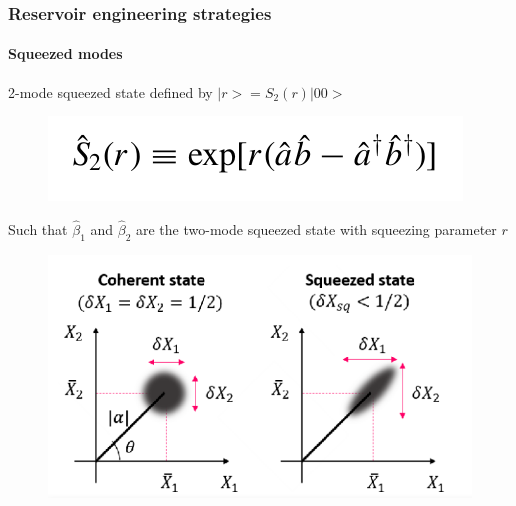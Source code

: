 \documentclass[aspectratio=43]{beamer}
\begin{document}
\begin{frame}
	
	\frametitle{Reservoir engineering strategies}
	\framesubtitle{Squeezed modes}
	
	2-mode squeezed state defined by $|r> = S_{2}(r) |00>$
	\begin{figure}
		\includegraphics[width = 5 cm]{plots/2_squeezed_mode.png}
	\end{figure}	

	Such that $\hat{\beta}_{1}$ and $\hat{\beta}_{2}$ are the two-mode squeezed state with squeezing parameter $r$

	\begin{figure}
		\includegraphics[width = 7 cm]{plots/plot_squeezed.png}
	\end{figure}
	
\end{frame}
\end{document}
